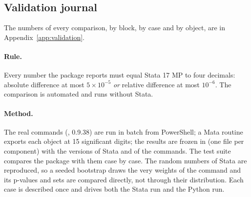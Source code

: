 \documentclass[
  10.5pt,
  a4paper,
]{article}
\begin{document}
\subsection{Validation journal}\label{note:valid}

The numbers of every comparison, by block, by case and by object, are in Appendix~\ref{app:validation}.

\paragraph{Rule.} Every number the package reports must equal Stata 17 MP to four decimals: absolute difference at most
$5\times10^{-5}$ \emph{or} relative difference at most $10^{-6}$. The comparison is automated and runs without Stata.

\paragraph{Method.} The real commands (,  0.9.38) are run in batch from PowerShell; a Mata
routine exports each object at 15 significant digits; the results are frozen in  (one file per
component) with the versions of Stata and of the commands. The test suite compares the package with them case by case.
The random numbers of Stata are reproduced, so a seeded bootstrap draws the very weights of the command and its
p-values and sets are compared directly, not through their distribution. Each case is described once and drives both the
Stata run and the Python run.
\end{document}
